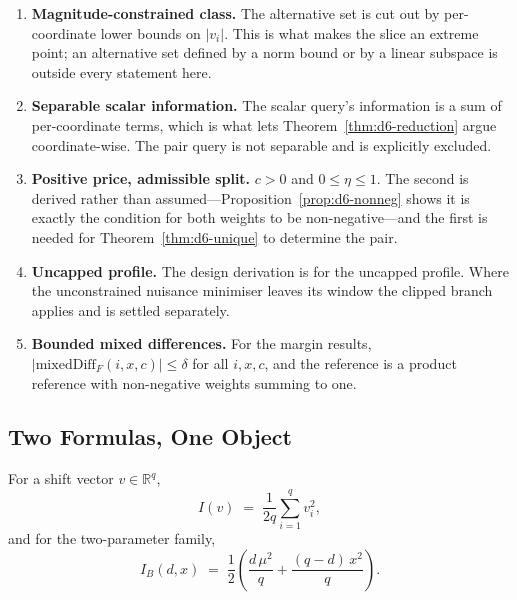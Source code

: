 \begin{enumerate}
\item[1)] \textbf{Magnitude-constrained class.} The alternative set is cut out by
per-coordinate lower bounds on $|v_{i}|$. This is what makes the slice an extreme point; an
alternative set defined by a norm bound or by a linear subspace is outside every statement
here.

\item[2)] \textbf{Separable scalar information.} The scalar query's information is a sum of
per-coordinate terms, which is what lets Theorem~\ref{thm:d6-reduction} argue coordinate-wise.
The pair query is not separable and is explicitly excluded.

\item[3)] \textbf{Positive price, admissible split.} $c>0$ and $0\le\eta\le1$. The second is
derived rather than assumed---Proposition~\ref{prop:d6-nonneg} shows it is exactly the condition
for both weights to be non-negative---and the first is needed for
Theorem~\ref{thm:d6-unique} to determine the pair.

\item[4)] \textbf{Uncapped profile.} The design derivation is for the uncapped profile. Where
the unconstrained nuisance minimiser leaves its window the clipped branch applies and is
settled separately.

\item[5)] \textbf{Bounded mixed differences.} For the margin results,
$|\mathrm{mixedDiff}_{F}(i,x,c)|\le\delta$ for all $i,x,c$, and the reference is a product
reference with non-negative weights summing to one.
\end{enumerate}

\subsection{Two Formulas, One Object}
\label{sec:d6-reduction}

\begin{definition}
For a shift vector $v\in\mathbb{R}^{q}$,
\begin{equation}
I(v)\;=\;\frac{1}{2q}\sum_{i=1}^{q} v_{i}^{2},
\label{eq:d6-igen}
\end{equation}
and for the two-parameter family,
\begin{equation}
I_{B}(d,x)\;=\;\frac{1}{2}\left(\frac{d\,\mu^{2}}{q}+\frac{(q-d)\,x^{2}}{q}\right).
\label{eq:d6-ib}
\end{equation}
\end{definition}

